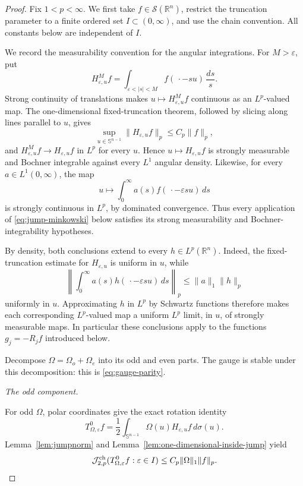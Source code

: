 \documentclass[11pt]{article}
\numberwithin{equation}{section}
\theoremstyle{remark}
\theoremstyle{definition}
\newcommand{\R}{\mathbb R}
\newcommand{\Sph}{\mathbb S}
\newcommand{\norm}[1]{\lVert #1\rVert}
\begin{document}
\begin{proof}
Fix $1<p<\infty$.  We first take $f\in\mathcal S(\R^n)$, restrict the
truncation parameter to a finite ordered set $I\subset(0,\infty)$, and
use the chain convention.  All constants below are independent of $I$.

We record the measurability convention for the angular integrations.  For
$M>\varepsilon$, put
\[
 H^M_{\varepsilon,u}f
 =\int_{\varepsilon<|s|<M}f(\,\cdot-su)\,\frac{ds}{s}.
\]
Strong continuity of translations makes
$u\mapsto H^M_{\varepsilon,u}f$ continuous as an $L^p$-valued map.  The
one-dimensional fixed-truncation theorem, followed by slicing along lines
parallel to $u$, gives
\[
 \sup_{u\in\Sph^{n-1}}\norm{H_{\varepsilon,u}f}_p
 \le C_p\norm f_p,
\]
and $H^M_{\varepsilon,u}f\to H_{\varepsilon,u}f$ in $L^p$ for every
$u$.  Hence $u\mapsto H_{\varepsilon,u}f$ is strongly measurable and
Bochner integrable against every $L^1$ angular density.  Likewise, for
every $a\in L^1(0,\infty)$, the map
\[
 u\longmapsto\int_0^\infty
 a(s)f(\,\cdot-\varepsilon su)\,ds
\]
is strongly continuous in $L^p$, by dominated convergence.  Thus every
application of \eqref{eq:jump-minkowski} below satisfies its strong
measurability and Bochner-integrability hypotheses.

By density, both conclusions extend to every $h\in L^p(\R^n)$.  Indeed,
the fixed-truncation estimate for $H_{\varepsilon,u}$ is uniform in $u$,
while
\[
 \left\|\int_0^\infty
 a(s)h(\,\cdot-\varepsilon su)\,ds\right\|_p
 \le\norm a_1\norm h_p
\]
uniformly in $u$.  Approximating $h$ in $L^p$ by Schwartz functions
therefore makes each corresponding $L^p$-valued map a uniform $L^p$
limit, in $u$, of strongly measurable maps.  In particular these
conclusions apply to the functions $g_j=-R_jf$ introduced below.

Decompose $\Omega=\Omega_o+\Omega_e$ into its odd and even parts.  The
gauge is stable under this decomposition: this is
\eqref{eq:gauge-parity}.

\smallskip
\noindent\emph{The odd component.}

For odd $\Omega$, polar coordinates give the exact rotation identity
\begin{equation}\label{eq:odd-rotation}
 T^0_{\Omega,\varepsilon}f
 =\frac12\int_{\Sph^{n-1}}\Omega(u)H_{\varepsilon,u}f\,d\sigma(u).
\end{equation}
Lemma~\ref{lem:jumpnorm} and Lemma~\ref{lem:one-dimensional-inside-jump} yield
\begin{equation}\label{eq:odd-jump}
 \mathcal J^{\rm ch}_{2,p}
 (T^0_{\Omega,\varepsilon}f:\varepsilon\in I)
 \le C_p\norm\Omega_1\norm f_p.
\end{equation}


\end{proof}
\end{document}
